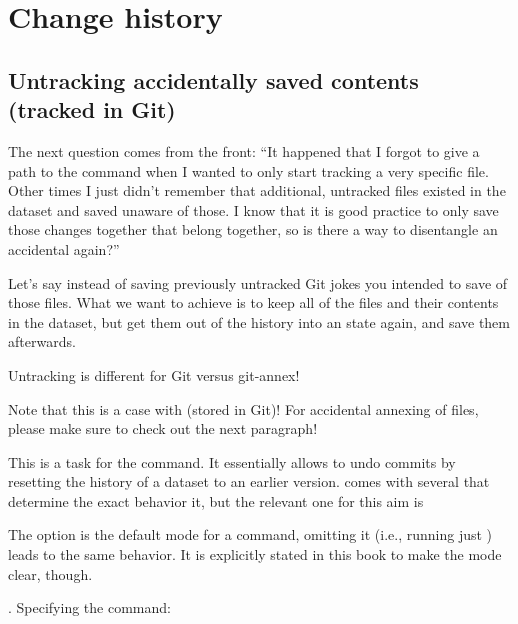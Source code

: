 \section{Change history}
\label{\detokenize{basics/101-137-history:change-history}}\label{\detokenize{basics/101-137-history:index-2}}

\subsection{Untracking accidentally saved contents (tracked in Git)}
\label{\detokenize{basics/101-137-history:untracking-accidentally-saved-contents-tracked-in-git}}
\sphinxAtStartPar
The next question comes from the front:
“It happened that I forgot to give a path to the 
command when I wanted to only start tracking a very specific file.
Other times I just didn’t remember that
additional, untracked files existed in the dataset and saved unaware of
those. I know that it is good practice to only save
those changes together that belong together, so is there a way to
disentangle an accidental  again?”

\sphinxAtStartPar
Let’s say instead of saving  previously untracked Git jokes
you intended to save  of those files. What we
want to achieve is to keep all of the files and their contents
in the dataset, but get them out of the history into an
 state again, and save them  afterwards.
\begin{importantnote}[before title={\thetcbcounter\ }, check odd page=true]{Untracking is different for Git versus git-annex!}

\sphinxAtStartPar
Note that this is a case with  (stored in Git)! For
accidental annexing of files, please make sure to check out
the next paragraph!


\end{importantnote}

\sphinxAtStartPar
This is a task for the  command. It essentially allows to
undo commits by resetting the history of a dataset to an earlier version.
 comes with several  that determine the
exact behavior it, but the relevant one for this aim is %
\begin{footnote}\sphinxAtStartFootnote
The option  is the default mode for a 
command, omitting it (i.e., running just ) leads to the
same behavior. It is explicitly stated in this book to make the mode
clear, though.
%
\end{footnote}.
Specifying the command:

